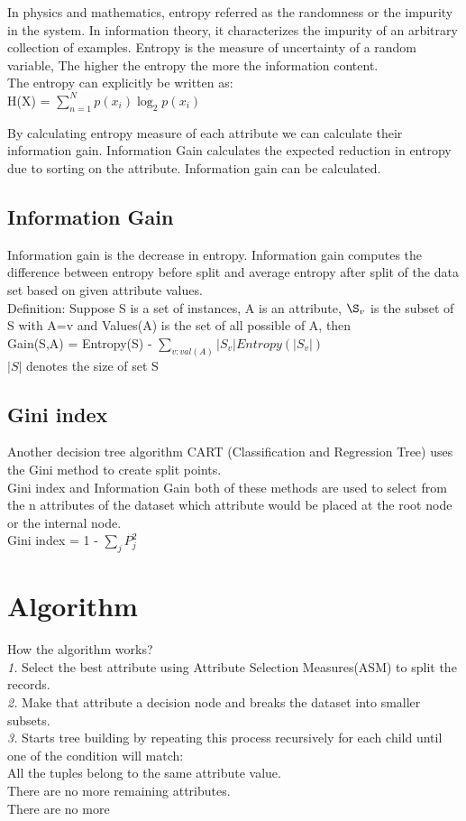 \documentclass[conference,compsoc]{IEEEtran}
\begin{document}
In physics and mathematics, entropy referred as the randomness or the impurity in the system. In information theory, it characterizes the impurity of an arbitrary collection of examples.
Entropy is the measure of uncertainty of a random variable, The higher the entropy the more the information content.
\\ The entropy can explicitly be written as:
\\ H(X) = $\sum_{n=1}^{N}p(x_i)\log_{2}p(x_i)$

   
By calculating entropy measure of each attribute we can calculate their information gain. Information Gain calculates the expected reduction in entropy due to sorting on the attribute. Information gain can be calculated. 

\subsection{Information Gain}

Information gain is the decrease in entropy. Information gain computes the difference between entropy before split and average entropy after split of the data set based on given attribute values.
\\ Definition: Suppose S is a set of instances, A is an attribute, $\S_v$ is the subset of S with A=v and Values(A) is the set of all possible of A, then \\ Gain(S,A) = Entropy(S) - $\sum_{v:val(A)} |S_v| Entropy(|S_v|)$
\\ $|S|$ denotes the size of set S


\subsection{Gini index}

Another decision tree algorithm CART (Classification and Regression Tree) uses the Gini method to create split points.
\\ Gini index and Information Gain both of these methods are used to select from the n attributes of the dataset which attribute would be placed at the root node or the internal node.
\\ Gini index = 1 - $\sum_{j} P_j^2$


\section{Algorithm }
How the algorithm works?\\
\textit{1.} Select the best attribute using Attribute Selection Measures(ASM) to split the records.
\\\textit{2.} Make that attribute a decision node and breaks the dataset into smaller subsets.
\\\textit{3.} Starts tree building by repeating this process recursively for each child until one of the condition will match:
\\ \textendash All the tuples belong to the same attribute value.
\\\textendash There are no more remaining attributes.
\\ \textendash There are no more 
\end{document}
